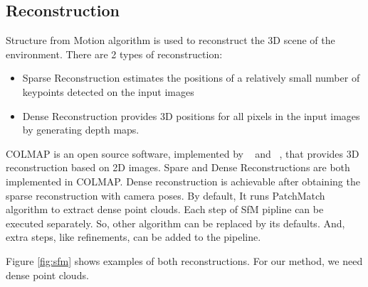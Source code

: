 \documentclass[11pt]{article}
\begin{document}
    \subsection{Reconstruction}
    Structure from Motion algorithm is used to reconstruct the 3D scene of the environment. There are 2 types of reconstruction:
    \begin{itemize}
        \item Sparse Reconstruction estimates the positions of a relatively small number of keypoints detected on the input images
        \item Dense Reconstruction provides 3D positions for all pixels in the input images by generating depth maps.
    \end{itemize}
    COLMAP is an open source software, implemented by ~\cite{schoenberger2016sfm} and ~\cite{schoenberger2016mvs},
    that provides 3D reconstruction based on 2D images. Spare and Dense Reconstructions are both implemented in COLMAP.
    Dense reconstruction is achievable after obtaining
    the sparse reconstruction with camera poses. By default, It runs PatchMatch algorithm \cite{journals/tog/BarnesSFG09} to extract dense point clouds.
    Each step of SfM pipline can be executed separately. So, other algorithm can be replaced by its defaults. And, extra steps, like refinements, can be added to the pipeline.


    Figure \ref{fig:sfm} shows examples of both reconstructions.
    For our method, we need dense point clouds.
\end{document}
